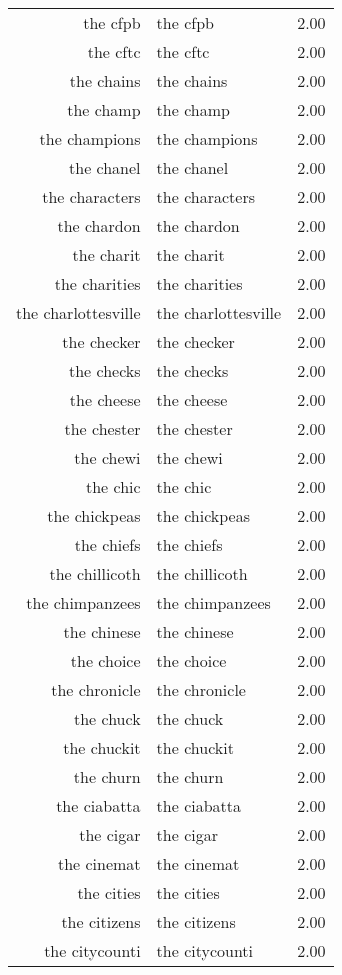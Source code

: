 \begin{table}[ht]
\begin{tabular}{rlr}
  the cfpb & the cfpb & 2.00 \\ 
  the cftc & the cftc & 2.00 \\ 
  the chains & the chains & 2.00 \\ 
  the champ & the champ & 2.00 \\ 
  the champions & the champions & 2.00 \\ 
  the chanel & the chanel & 2.00 \\ 
  the characters & the characters & 2.00 \\ 
  the chardon & the chardon & 2.00 \\ 
  the charit & the charit & 2.00 \\ 
  the charities & the charities & 2.00 \\ 
  the charlottesville & the charlottesville & 2.00 \\ 
  the checker & the checker & 2.00 \\ 
  the checks & the checks & 2.00 \\ 
  the cheese & the cheese & 2.00 \\ 
  the chester & the chester & 2.00 \\ 
  the chewi & the chewi & 2.00 \\ 
  the chic & the chic & 2.00 \\ 
  the chickpeas & the chickpeas & 2.00 \\ 
  the chiefs & the chiefs & 2.00 \\ 
  the chillicoth & the chillicoth & 2.00 \\ 
  the chimpanzees & the chimpanzees & 2.00 \\ 
  the chinese & the chinese & 2.00 \\ 
  the choice & the choice & 2.00 \\ 
  the chronicle & the chronicle & 2.00 \\ 
  the chuck & the chuck & 2.00 \\ 
  the chuckit & the chuckit & 2.00 \\ 
  the churn & the churn & 2.00 \\ 
  the ciabatta & the ciabatta & 2.00 \\ 
  the cigar & the cigar & 2.00 \\ 
  the cinemat & the cinemat & 2.00 \\ 
  the cities & the cities & 2.00 \\ 
  the citizens & the citizens & 2.00 \\ 
  the citycounti & the citycounti & 2.00 \\ 

\end{tabular}
\end{table}
